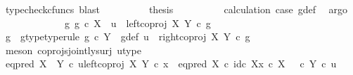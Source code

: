 \begin{isabellebody}
\ {\isacharparenleft}{\kern0pt}typecheck{\isacharunderscore}{\kern0pt}cfuncs{\isacharcomma}{\kern0pt}\ blast{\isacharparenright}{\kern0pt}\isanewline
\ \ \ \ \ \ \isamarkupfalse%
\ \isamarkupfalse%
\ {\isacharquery}{\kern0pt}thesis\isanewline
\ \ \ \ \ \ \ \ \isamarkupfalse%
\ calculation\ case{}\ g{\isacharunderscore}{\kern0pt}def\ \isamarkupfalse%
\ argo\isanewline
\ \ \ \ \isamarkupfalse%
\isanewline
\ \ \isamarkupfalse%
\isanewline
\ \ \ \ \isamarkupfalse%
\ {\isachardoublequoteopen}{\isasymnexists}g{\isachardot}{\kern0pt}\ g\ {\isasymin}\isactrlsub c\ X\ {\isasymand}\ u\ {\isacharequal}{\kern0pt}\ left{\isacharunderscore}{\kern0pt}coproj\ X\ Y\ {\isasymcirc}\isactrlsub c\ g{\isachardoublequoteclose}\isanewline
\ \ \ \ \isamarkupfalse%
\ \isamarkupfalse%
\ g\ \ g{\isacharunderscore}{\kern0pt}type{\isacharbrackleft}{\kern0pt}type{\isacharunderscore}{\kern0pt}rule{\isacharbrackright}{\kern0pt}{\isacharcolon}{\kern0pt}\ {\isachardoublequoteopen}g\ {\isasymin}\isactrlsub c\ Y{\isachardoublequoteclose}\ \ g{\isacharunderscore}{\kern0pt}def{\isacharcolon}{\kern0pt}\ {\isachardoublequoteopen}u\ {\isacharequal}{\kern0pt}\ right{\isacharunderscore}{\kern0pt}coproj\ X\ Y\ {\isasymcirc}\isactrlsub c\ g{\isachardoublequoteclose}\isanewline
\ \ \ \ \ \ \isamarkupfalse%
\ {\isacharparenleft}{\kern0pt}meson\ coprojs{\isacharunderscore}{\kern0pt}jointly{\isacharunderscore}{\kern0pt}surj\ u{\isacharunderscore}{\kern0pt}type{\isacharparenright}{\kern0pt}\isanewline
\isanewline
\ \ \ \ \isamarkupfalse%
\ {\isachardoublequoteopen}eq{\isacharunderscore}{\kern0pt}pred\ {\isacharparenleft}{\kern0pt}X\ {\isasymCoprod}\ Y{\isacharparenright}{\kern0pt}\ {\isasymcirc}\isactrlsub c\ {\isasymlangle}u{\isacharcomma}{\kern0pt}left{\isacharunderscore}{\kern0pt}coproj\ X\ Y\ {\isasymcirc}\isactrlsub c\ x{\isasymrangle}\ {\isacharequal}{\kern0pt}\ {\isacharparenleft}{\kern0pt}eq{\isacharunderscore}{\kern0pt}pred\ X\ {\isasymcirc}\isactrlsub c\ {\isasymlangle}id\isactrlsub c\ X{\isacharcomma}{\kern0pt}x\ {\isasymcirc}\isactrlsub c\ {\isasymbeta}\isactrlbsub X\isactrlesub {\isasymrangle}{\isacharparenright}{\kern0pt}\ {\isasymamalg}\ {\isacharparenleft}{\kern0pt}{\isasymf}\ {\isasymcirc}\isactrlsub c\ {\isasymbeta}\isactrlbsub Y\isactrlesub {\isacharparenright}{\kern0pt}\ {\isasymcirc}\isactrlsub c\ u{\isachardoublequoteclose}\ \ \isanewline
\ \ \ \ \isamarkupfalse%

\end{isabellebody}
